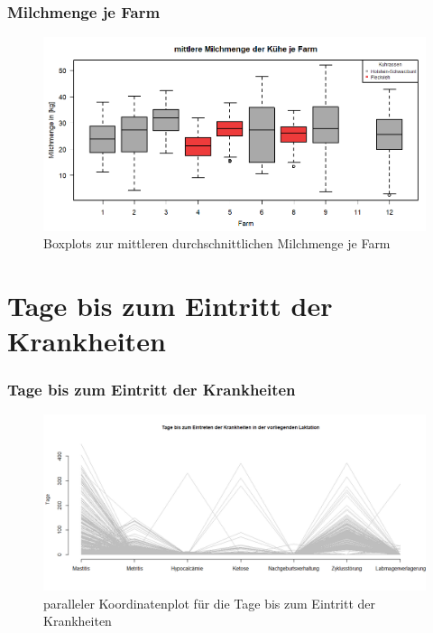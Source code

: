 \documentclass{beamer}
\begin{document}
	\begin{frame}
		\frametitle{Milchmenge je Farm}
		\begin{figure}[h]
			\centering
			\includegraphics[width=1\textwidth]{Boxplot Milch~Farm.png}
			\vspace{-0.6cm}
			\caption{Boxplots zur mittleren durchschnittlichen Milchmenge je Farm}
		\end{figure}
	\end{frame}

	\section{Tage bis zum Eintritt der Krankheiten}
 \begin{frame}
		\frametitle{Tage bis zum Eintritt der Krankheiten}
	\begin{figure}[h]
		\centering
		\includegraphics[width=1\textwidth]{paralleler Koordinatenplot.png}
		\vspace{}
		\caption{paralleler Koordinatenplot für die Tage bis zum Eintritt der Krankheiten}
	\end{figure}
\end{frame}
\end{document}
